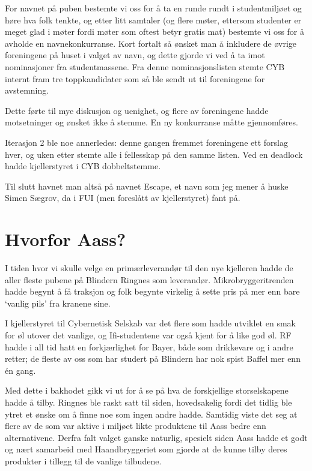 For navnet på puben bestemte vi oss for å ta en runde rundt i studentmiljøet og høre hva folk tenkte, og etter litt samtaler (og flere møter, ettersom studenter er meget glad i møter fordi møter som oftest betyr gratis mat) bestemte vi oss for å avholde en navnekonkurranse. Kort fortalt så ønsket man å inkludere de øvrige foreningene på huset i valget av navn, og dette gjorde vi ved å ta imot nominasjoner fra studentmassene. Fra denne nominasjonslisten stemte CYB internt fram tre toppkandidater som så ble sendt ut til foreningene for avstemning.

Dette førte til mye diskusjon og uenighet, og flere av foreningene hadde motsetninger og ønsket ikke å stemme. En ny konkurranse måtte gjennomføres.

Iterasjon 2 ble noe annerledes: denne gangen fremmet foreningene ett forslag hver, og uken etter stemte alle i fellesskap på den samme listen. Ved en deadlock hadde kjellerstyret i CYB dobbeltstemme.

Til slutt havnet man altså på navnet Escape, et navn som jeg mener å huske Simen Sægrov, da i FUI (men foreslått av kjellerstyret) fant på.

\section{Hvorfor Aass?}

I tiden hvor vi skulle velge en primærleverandør til den nye kjelleren hadde de aller fleste pubene på Blindern Ringnes som leverandør. Mikrobryggeritrenden hadde begynt å få traksjon og folk begynte virkelig å sette pris på mer enn bare `vanlig pils' fra kranene sine.

I kjellerstyret til Cybernetisk Selskab var det flere som hadde utviklet en smak for øl utover det vanlige, og Ifi-studentene var også kjent for å like god øl. RF hadde i all tid hatt en forkjærlighet for Bayer, både som drikkevare og i andre retter; de fleste av oss som har studert på Blindern har nok spist Baffel mer enn én gang.

Med dette i bakhodet gikk vi ut for å se på hva de forskjellige storselskapene hadde å tilby. Ringnes ble raskt satt til siden, hovedsakelig fordi det tidlig ble ytret et ønske om å finne noe som ingen andre hadde. Samtidig viste det seg at flere av de som var aktive i miljøet likte produktene til Aass bedre enn alternativene. Derfra falt valget ganske naturlig, spesielt siden Aass hadde et godt og nært samarbeid med Haandbryggeriet som gjorde at de kunne tilby deres produkter i tillegg til de vanlige tilbudene.


